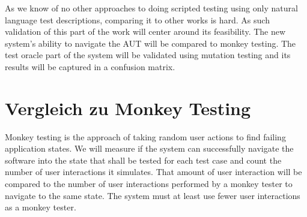 \begin{figure}
    
\end{figure}


As we know of no other approaches to doing scripted testing using only natural language test descriptions, comparing it to other works is hard.
As such validation of this part of the work will center around its feasibility.
The new system's ability to navigate the AUT will be compared to monkey testing.
The test oracle part of the system will be validated using mutation testing and its results will be captured in a confusion matrix.

\section{Vergleich zu Monkey Testing}

Monkey testing is the approach of taking random user actions to find failing application states.
We will measure if the system can successfully navigate the software into the state that shall be tested for each test case and count the number of user interactions it simulates.
That amount of user interaction will be compared to the number of user interactions performed by a monkey tester to navigate to the same state.
The system must at least use fewer user interactions as a monkey tester.
